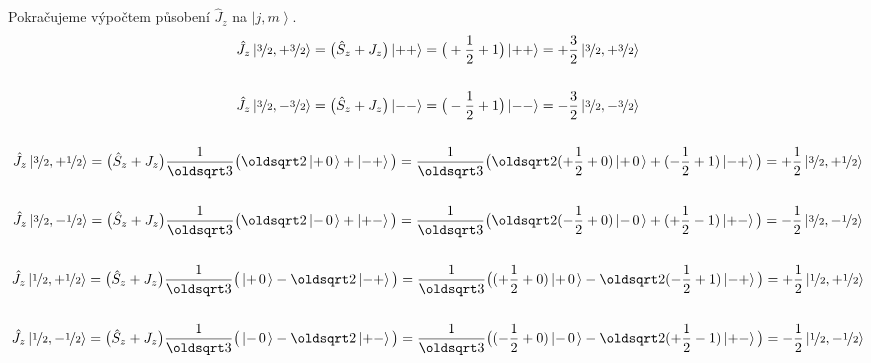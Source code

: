 \documentclass[10pt,a4paper]{article}
\newcommand*{\mask}[2]{%
    \mathord{\makebox[\widthof{\(#1\)}]{\(#2\)}}%
}
\newcommand{\ket}[1]{\left| #1 \right>}
\def\0{\mask{+}{0}}
\begin{document}
Pokračujeme výpočtem působení $\hat J_z$ na $\ket{j,m}$.
\begin{gather*}
    \hat J_z \ket{ \nicefrac{3}{2}, +\nicefrac{3}{2} }
    = \big( \hat S_z + J_z \big) \ket{++}
    = \big( +\frac{1}{2} + 1 \big) \ket{++}
    = +\frac{3}{2} \ket{ \nicefrac{3}{2}, +\nicefrac{3}{2} }
    \\\\
    \hat J_z \ket{ \nicefrac{3}{2}, -\nicefrac{3}{2} }
    = \big( \hat S_z + J_z \big) \ket{--}
    = \big( -\frac{1}{2}  + 1 \big) \ket{--}
    = -\frac{3}{2} \ket{ \nicefrac{3}{2}, -\nicefrac{3}{2} }
    \\\\
    \hat J_z \ket{ \nicefrac{3}{2}, +\nicefrac{1}{2} }
    = \big( \hat S_z + J_z \big)
    \frac{1}{\oldsqrt 3} \big(
        \oldsqrt 2 \ket{+\0} + \ket{-+}
    \big)
    = \frac{1}{\oldsqrt 3} \big(
        \oldsqrt 2
        (+\frac{1}{2} + 0)
        \ket{+\0}
        +
        (-\frac{1}{2} + 1)
        \ket{-+}
    \big)
    =
    +\frac{1}{2}
    \ket{ \nicefrac{3}{2}, +\nicefrac{1}{2} }
    \\\\
    \hat J_z \ket{ \nicefrac{3}{2}, -\nicefrac{1}{2} }
    = \big( \hat S_z + J_z \big)
    \frac{1}{\oldsqrt 3} \big(
        \oldsqrt 2 \ket{-\0} + \ket{+-}
    \big)
    = \frac{1}{\oldsqrt 3} \big(
        \oldsqrt 2
        (-\frac{1}{2} + 0)
        \ket{-\0}
        +
        (+\frac{1}{2} - 1)
        \ket{+-}
    \big)
    =
    -\frac{1}{2}
    \ket{ \nicefrac{3}{2}, -\nicefrac{1}{2} }
    \\\\
    \hat J_z \ket{ \nicefrac{1}{2}, +\nicefrac{1}{2} }
    = \big( \hat S_z + J_z \big)
    \frac{1}{\oldsqrt 3} \big(
        \ket{+\0} - \oldsqrt 2 \ket{-+}
    \big)
    = \frac{1}{\oldsqrt 3} \big(
        (+\frac{1}{2} + 0)
        \ket{+\0}
        -
        \oldsqrt 2
        (-\frac{1}{2} + 1)
        \ket{-+}
    \big)
    =
    +\frac{1}{2}
    \ket{ \nicefrac{1}{2}, +\nicefrac{1}{2} }
    \\\\
    \hat J_z \ket{ \nicefrac{1}{2}, -\nicefrac{1}{2} }
    = \big( \hat S_z + J_z \big)
    \frac{1}{\oldsqrt 3} \big(
        \ket{-\0} - \oldsqrt 2 \ket{+-}
    \big)
    = \frac{1}{\oldsqrt 3} \big(
        (-\frac{1}{2} + 0)
        \ket{-\0}
        -
        \oldsqrt 2
        (+\frac{1}{2} - 1)
        \ket{+-}
    \big)
    =
    -\frac{1}{2}
    \ket{ \nicefrac{1}{2}, -\nicefrac{1}{2} }
\end{gather*}
\end{document}
